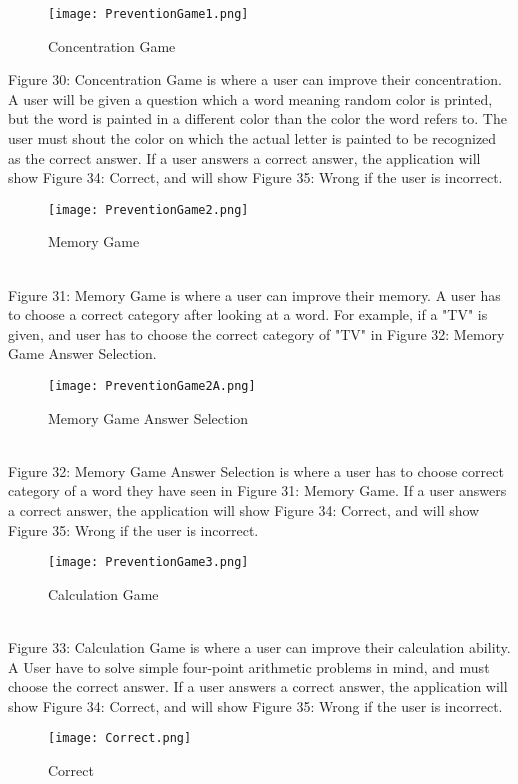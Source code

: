 \documentclass[conference]{IEEEtran}
\begin{document}
\begin{figure}[h]
\centerline{\texttt{[image: PreventionGame1.png]}}
\caption{Concentration Game}
\label{fig}
\end{figure}
Figure 30: Concentration Game is where a user can improve their concentration. A user will be given a question which a word meaning random color is printed, but the word is painted in a different color than the color the word refers to. The user must shout the color on which the actual letter is painted to be recognized as the correct answer. If a user answers a correct answer, the application will show Figure 34: Correct, and will show Figure 35: Wrong if the user is incorrect.
\\
\begin{figure}[h]
\centerline{\texttt{[image: PreventionGame2.png]}}
\caption{Memory Game}
\label{fig}
\end{figure}
\\
Figure 31: Memory Game is where a user can improve their memory. A user has to choose a correct category after looking at a word. For example, if a "TV" is given, and user has to choose the correct category of "TV" in Figure 32: Memory Game Answer Selection.
\\
\begin{figure}[h]
\centerline{\texttt{[image: PreventionGame2A.png]}}
\caption{Memory Game Answer Selection}
\label{fig}
\end{figure}
\\
Figure 32: Memory Game Answer Selection is where a user has to choose correct category of a word they have seen in Figure 31: Memory Game. If a user answers a correct answer, the application will show Figure 34: Correct, and will show Figure 35: Wrong if the user is incorrect.
\\
\clearpage
\begin{figure}[h]
\centerline{\texttt{[image: PreventionGame3.png]}}
\caption{Calculation Game}
\label{fig}
\end{figure}
\\
Figure 33: Calculation Game is where a user can improve their calculation ability. A User have to solve simple four-point arithmetic problems in mind, and must choose the correct answer. If a user answers a correct answer, the application will show Figure 34: Correct, and will show Figure 35: Wrong if the user is incorrect.
\\
\begin{figure}[h]
\centerline{\texttt{[image: Correct.png]}}
\caption{Correct}
\label{fig}
\end{figure}
\end{document}
